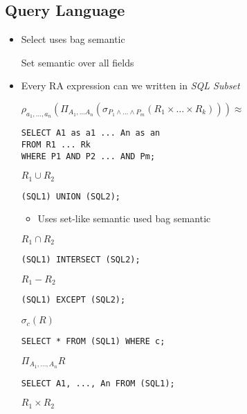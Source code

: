 \subsection{Query Language}
\begin{itemize}
        \begin{itemize}
             List of relation whose cross product is taken
             Selection condition
             Projection
        \end{itemize}
    \item Select uses bag semantic
        \begin{itemize}
             Set semantic over all fields
        \end{itemize}
    \item Every RA expression can we written in \textit{SQL Subset}
        \begin{itemize}
             $\rho_{a_1, \dots , a_n}(\Pi_{A_1, \dots A_n}(\sigma_{P_1 \wedge \dots \wedge P_m}(R_1 \times \dots \times R_k))) \approx$
\begin{verbatim}
SELECT A1 as a1 ... An as an
FROM R1 ... Rk
WHERE P1 AND P2 ... AND Pm;
\end{verbatim}
             $R_1 \cup R_2$
\begin{verbatim}
(SQL1) UNION (SQL2);
\end{verbatim}
                \begin{itemize}
                    \item Uses set-like semantic
                     used bag semantic
                \end{itemize}
             $R_1 \cap R_2$
\begin{verbatim}
(SQL1) INTERSECT (SQL2);
\end{verbatim}
             $R_1 - R_2$
\begin{verbatim}
(SQL1) EXCEPT (SQL2);
\end{verbatim}
             $\sigma_c(R)$
\begin{verbatim}
SELECT * FROM (SQL1) WHERE c;
\end{verbatim}
             $\Pi_{A_1, \dots , A_n} R$
\begin{verbatim}
SELECT A1, ..., An FROM (SQL1);
\end{verbatim}
             $R_1 \times R_2$

\end{itemize}
\end{itemize}
